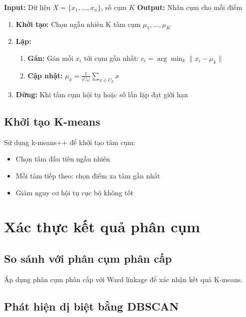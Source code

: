 \begin{algorithm}
\textbf{Input:} Dữ liệu $X = \{x_1, \ldots, x_n\}$, số cụm $K$
\newline
\textbf{Output:} Nhãn cụm cho mỗi điểm
\begin{enumerate}
    \item \textbf{Khởi tạo:} Chọn ngẫu nhiên K tâm cụm $\mu_1, \ldots, \mu_K$
    \item \textbf{Lặp:}
    \begin{enumerate}
        \item \textbf{Gán:} Gán mỗi $x_i$ tới cụm gần nhất: $c_i = \arg\min_k \|x_i - \mu_k\|$
        \item \textbf{Cập nhật:} $\mu_k = \frac{1}{|C_k|} \sum_{x \in C_k} x$
    \end{enumerate}
    \item \textbf{Dừng:} Khi tâm cụm hội tụ hoặc số lần lặp đạt giới hạn
\end{enumerate}
\end{algorithm}

\subsection{Khởi tạo K-means}

Sử dụng k-means++ để khởi tạo tâm cụm:
\begin{itemize}
    \item Chọn tâm đầu tiên ngẫu nhiên
    \item Mỗi tâm tiếp theo: chọn điểm xa tâm gần nhất
    \item Giảm nguy cơ hội tụ cục bộ không tốt
\end{itemize}

\section{Xác thực kết quả phân cụm}

\subsection{So sánh với phân cụm phân cấp}

Áp dụng phân cụm phân cấp với Ward linkage để xác nhận kết quả K-means.

\subsection{Phát hiện dị biệt bằng DBSCAN}

